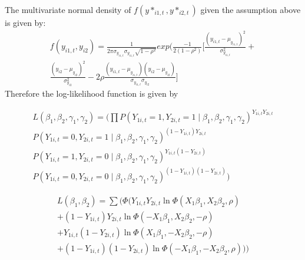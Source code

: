 \documentclass[11pt]{article}
\begin{document}
The multivariate normal density  of $f(y*_{i1,t} , y*_{i2,t})$  given the assumption above is given by: 
\begin{equation}
\begin{aligned}
    f(y_{i1,t},y_{i2}) = \frac{1}{2\pi \sigma_{y_{i1,t}}\sigma_{y_{i1,t}}\sqrt{1-\rho^2}} exp(\frac{-1}{2(1-\rho^2)} [\frac{(y_{i1,t} - \mu_{y_{i1,t}})^2}{\sigma_{y_{i1,t}}^{2}} + \\
    \frac{(y_{i2} - \mu_{y_{i2}})^2}{\sigma_{y_{i2}}^{2}} 
    -2 \rho \frac{(y_{i1,t} - \mu_{y_{i1,t}}) (y_{i2} - \mu_{y_{i2}})
    }{\sigma_{y_{i1,t}}\sigma_{y_{i2}}}]
  \end{aligned}
\end{equation}
Therefore the log-likelihood function is given by 

\begin{equation}
\begin{aligned}
L(\beta_1,\beta_2,\gamma_1,\gamma_2) = \Big( \prod
P(Y_{1i,t}=1,Y_{2i,t}=1\mid\beta_1,\beta_2,\gamma_1,\gamma_2)^{Y_{1i,t}Y_{2i,t}}\\
 P(Y_{1i,t}=0,Y_{2i,t}=1\mid\beta_1,\beta_2,\gamma_1,\gamma_2)^{(1-Y_{1i,t})Y_{2i,t}}  \\
P(Y_{1i,t}=1,Y_{2i,t}=0\mid\beta_1,\beta_2,\gamma_1,\gamma_2)^{Y_{1i,t}(1-Y_{2i,t})}\\
P(Y_{1i,t}=0,Y_{2i,t}=0\mid\beta_1,\beta_2,\gamma_1,\gamma_2)^{(1-Y_{1i,t})(1-Y_{2i,t})} \Big)
\end{aligned}
\end{equation}




\begin{equation}
\begin{aligned}
L(\beta_1,\beta_2) = \sum(\Phi( Y_{1i,t}Y_{2i,t}\ln \Phi(X_1\beta_1,X_2\beta_2,\rho) \\
 + (1-Y_{1i,t})Y_{2i,t}\ln \Phi(-X_1\beta_1,X_2\beta_2,-\rho) \\
+ Y_{1i,t}(1-Y_{2i,t})\ln \Phi(X_1\beta_1,-X_2\beta_2,-\rho) \\
 +(1-Y_{1i,t})(1-Y_{2i,t})\ln \Phi(-X_1\beta_1,-X_2\beta_2,\rho) \Big))\\
\end{aligned}
\end{equation}
\end{document}
